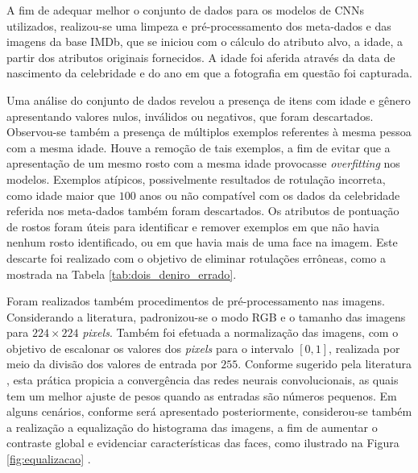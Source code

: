 A fim de adequar melhor o conjunto de dados para os modelos de CNNs utilizados, realizou-se uma limpeza e pré-processamento dos meta-dados e das imagens da base IMDb, que se iniciou com o cálculo do atributo alvo, a idade, a partir dos atributos originais fornecidos. A idade foi aferida através da data de nascimento da celebridade e do ano em que a fotografia em questão foi capturada.

Uma análise do conjunto de dados revelou a presença de itens com idade e gênero apresentando valores nulos, inválidos ou negativos, que foram descartados. Observou-se também a presença de múltiplos exemplos referentes à mesma pessoa com a mesma idade. Houve a remoção de tais exemplos, a fim de evitar que a apresentação de um mesmo rosto com a mesma idade provocasse \emph{overfitting} nos modelos. Exemplos atípicos, possivelmente resultados de rotulação incorreta, como idade maior que $100$ anos ou não compatível com os dados da celebridade referida nos meta-dados também foram descartados. Os atributos de pontuação de rostos foram úteis para identificar e remover exemplos em que não havia nenhum rosto identificado, ou em que havia mais de uma face na imagem. Este descarte foi realizado com o objetivo de eliminar rotulações errôneas, como a mostrada na Tabela \ref{tab:dois_deniro_errado}.

Foram realizados também procedimentos de pré-processamento nas imagens. Considerando a literatura, padronizou-se o modo RGB e o tamanho das imagens para $224 \times 224$ \emph{pixels}.  Também foi efetuada a normalização das imagens, com o objetivo de escalonar os valores dos \emph{pixels} para o intervalo $[0,1]$, realizada por meio da divisão dos valores de entrada por  $255$. Conforme sugerido pela literatura \cite[vide Seção 5.2.4]{chollet2017deep}, esta prática propicia a convergência das redes neurais convolucionais, as quais tem um melhor ajuste de pesos quando as entradas são números pequenos. Em alguns cenários, conforme será apresentado posteriormente, considerou-se também a realização a equalização do histograma das imagens, a fim de aumentar o contraste global e evidenciar características das faces, como ilustrado na Figura \ref{fig:equalizacao} \cite{acharya2005image}.

